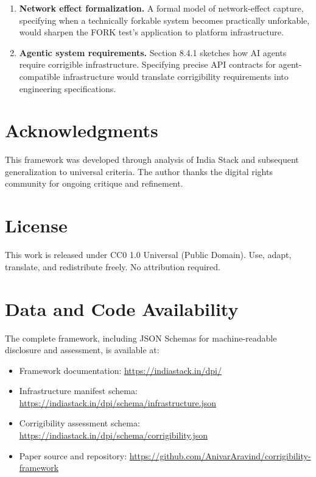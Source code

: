 \begin{enumerate}
    \item \textbf{Network effect formalization.} A formal model of network-effect capture, specifying when a technically forkable system becomes practically unforkable, would sharpen the FORK test's application to platform infrastructure.

    \item \textbf{Agentic system requirements.} Section 8.4.1 sketches how AI agents require corrigible infrastructure. Specifying precise API contracts for agent-compatible infrastructure would translate corrigibility requirements into engineering specifications.
\end{enumerate}

\section*{Acknowledgments}

This framework was developed through analysis of India Stack and subsequent generalization to universal criteria. The author thanks the digital rights community for ongoing critique and refinement.

\section*{License}

This work is released under CC0 1.0 Universal (Public Domain). Use, adapt, translate, and redistribute freely. No attribution required.

\section*{Data and Code Availability}

The complete framework, including JSON Schemas for machine-readable disclosure and assessment, is available at:

\begin{itemize}
    \item Framework documentation: \url{https://indiastack.in/dpi/}
    \item Infrastructure manifest schema: \url{https://indiastack.in/dpi/schema/infrastructure.json}
    \item Corrigibility assessment schema: \url{https://indiastack.in/dpi/schema/corrigibility.json}
    \item Paper source and repository: \url{https://github.com/AnivarAravind/corrigibility-framework}
\end{itemize}

